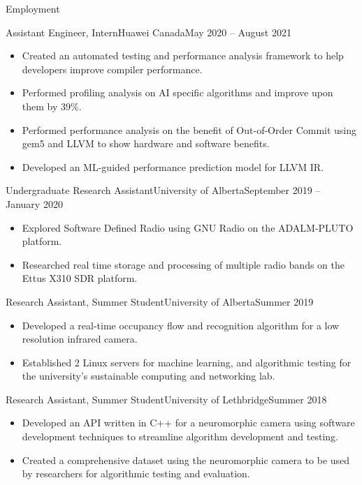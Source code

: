 \documentclass[]{mcdowellcv}
\begin{document}
\begin{cvsection}{Employment}
   \begin{cvsubsection}{Assistant Engineer, Intern}{Huawei Canada}{May 2020 -- August 2021}
    \vspace*{5pt}
    \begin{itemize}
      \item Created an automated testing and performance analysis framework to help developers improve compiler performance.
      \item Performed profiling analysis on AI specific algorithms and improve upon them by 39\%.
      \item Performed performance analysis on the benefit of Out-of-Order Commit using gem5 and LLVM to show hardware and software benefits.
      \item Developed an ML-guided performance prediction model for LLVM IR.
    \end{itemize}

  \end{cvsubsection}
  
  \begin{cvsubsection}{Undergraduate Research Assistant}{University of Alberta}{September 2019 -- January 2020}
    \vspace*{5pt}
    \begin{itemize}
      \item Explored Software Defined Radio using GNU Radio on the ADALM-PLUTO platform.
      \item Researched real time storage and processing of multiple radio bands on the Ettus X310 SDR platform.
    \end{itemize}

  \end{cvsubsection}
  \begin{cvsubsection}{Research Assistant, Summer Student}{University of Alberta}{Summer 2019}
    \vspace*{5pt}		
    \begin{itemize}
      \item Developed a real-time occupancy flow and recognition algorithm for a low resolution infrared camera.
      \item Established 2 Linux servers for machine learning, and algorithmic testing for the university's sustainable computing and networking lab.
    \end{itemize}
  \end{cvsubsection}
  \begin{cvsubsection}{Research Assistant, Summer Student}{University of Lethbridge}{Summer 2018}	
    \vspace*{5pt}
    \begin{itemize}
      \item Developed an API written in C++ for a neuromorphic camera using software development techniques to streamline algorithm development and testing.
      \item Created a comprehensive dataset using the neuromorphic camera to be used by researchers for algorithmic testing and evaluation.
    \end{itemize}
  \end{cvsubsection}
\end{cvsection}
\end{document}

